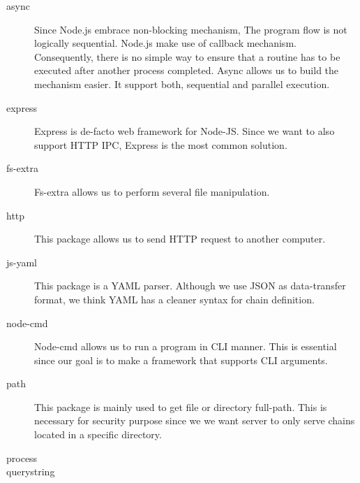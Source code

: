 \documentclass[conference]{IEEEtran}
\begin{document}
\begin{description}
    \item [async]
        \begin{sloppypar}
        Since Node.js embrace non-blocking mechanism, The program flow is not
        logically sequential. Node.js make use of callback mechanism. Consequently,
        there is no simple way to ensure that a routine has to be executed after another
        process completed. Async allows us to build the mechanism easier. It support
        both, sequential and parallel execution.
        \end{sloppypar}

    \item [express]
        \begin{sloppypar}
        Express is de-facto web framework for Node-JS. Since we want to also
        support HTTP IPC, Express is the most common solution.
        \end{sloppypar}

    \item [fs-extra]
        \begin{sloppypar}
        Fs-extra allows us to perform several file manipulation.
        \end{sloppypar}

    \item [http]
        \begin{sloppypar}
        This package allows us to send HTTP request to another computer.
        \end{sloppypar}

    \item [js-yaml]
        \begin{sloppypar}
        This package is a YAML parser. Although we use JSON as data-transfer
        format, we think YAML has a cleaner syntax for chain definition.
        \end{sloppypar}

    \item [node-cmd]
        \begin{sloppypar}
        Node-cmd allows us to run a program in CLI manner. This is 
        essential since our goal is to make a framework that supports CLI arguments.
        \end{sloppypar}

    \item [path]
        \begin{sloppypar}
        This package is mainly used to get file or directory full-path. This
        is necessary for security purpose since we we want server to only serve chains
        located in a specific directory.
        \end{sloppypar}

    \item [process]
    \item [querystring]
\end{description}
\end{document}
